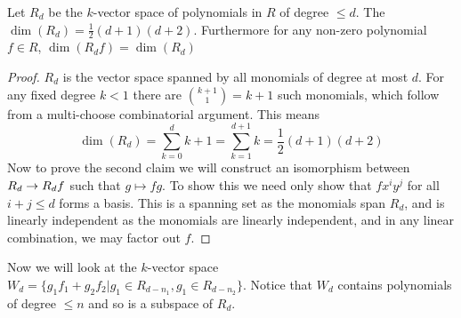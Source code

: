 \begin{lemma}
\label{lem:1Bi}
Let $R_d$ be the $k$-vector space of polynomials in $R$ of degree $\leq d$. The $\dim(R_d)=\frac{1}{2}(d+1)(d+2)$. Furthermore for any non-zero polynomial $f\in R$, $\dim(R_df)=\dim(R_d)$
\end{lemma}
\begin{proof}
$R_d$ is the vector space spanned by all monomials of degree at most $d$. For any fixed degree $k<1$ there are ${k+1\choose 1}=k+1$ such monomials, which follow from a multi-choose combinatorial argument. This means 
$$\dim(R_d)=\sum_{k=0}^dk+1=\sum_{k=1}^{d+1}k=\frac{1}{2}(d+1)(d+2)$$
Now to prove the second claim we will construct an isomorphism between $R_d\rightarrow R_df$ such that $g\mapsto fg$. To show this we need only show that $fx^iy^j$ for all $i+j\leq d$ forms a basis. This is a spanning set as the monomials span $R_d$, and is linearly independent as the monomials are linearly independent, and in any linear combination, we may factor out $f$.
\end{proof}


Now we will look at the $k$-vector space $W_d=\{g_1f_1+g_2f_2| g_1\in R_{d-n_1},g_1\in R_{d-n_2}\}$. Notice that $W_d$ contains polynomials of degree $\leq n$ and so is a subspace of $R_d$.

